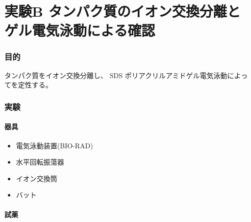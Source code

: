 \documentclass[a4paper]{ltjsarticle}
\begin{document}
\part{実験B タンパク質のイオン交換分離とゲル電気泳動による確認}

\section{目的}

タンパク質をイオン交換分離し、
SDS ポリアクリルアミドゲル電気泳動によってを定性する。


\section{実験}



\subsection{器具}

\begin{itemize}
    \item 電気泳動装置(BIO-RAD)
    \item 水平回転振蕩器
    \item イオン交換筒
    \item バット
\end{itemize}

\subsection{試薬}
\end{document}
